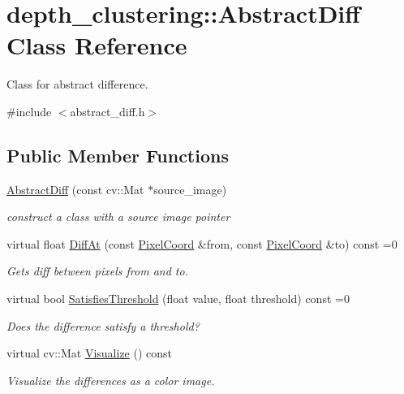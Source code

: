 \hypertarget{classdepth__clustering_1_1AbstractDiff}{\section{depth\-\_\-clustering\-:\-:Abstract\-Diff Class Reference}
\label{classdepth__clustering_1_1AbstractDiff}
}


Class for abstract difference.  




{\ttfamily \#include $<$abstract\-\_\-diff.\-h$>$}

\subsection*{Public Member Functions}
\begin{DoxyCompactItemize}
\item 
\hyperlink{classdepth__clustering_1_1AbstractDiff_a14160500db5c2c1c1948a9e563318cc8}{Abstract\-Diff} (const cv\-::\-Mat $\ast$source\-\_\-image)
\begin{DoxyCompactList}\small\item\em construct a class with a source image pointer \end{DoxyCompactList}\item 
virtual float \hyperlink{classdepth__clustering_1_1AbstractDiff_a06ba188d8d83d0e4bad66c833656c26d}{Diff\-At} (const \hyperlink{structdepth__clustering_1_1PixelCoord}{Pixel\-Coord} \&from, const \hyperlink{structdepth__clustering_1_1PixelCoord}{Pixel\-Coord} \&to) const =0
\begin{DoxyCompactList}\small\item\em Gets diff between pixels from and to. \end{DoxyCompactList}\item 
virtual bool \hyperlink{classdepth__clustering_1_1AbstractDiff_a940280569ed86d8f7e95626b1a2312d7}{Satisfies\-Threshold} (float value, float threshold) const =0
\begin{DoxyCompactList}\small\item\em Does the difference satisfy a threshold? \end{DoxyCompactList}\item 
virtual cv\-::\-Mat \hyperlink{classdepth__clustering_1_1AbstractDiff_a5500c82f3e6800922ba6fc6c22c6d0bf}{Visualize} () const 
\begin{DoxyCompactList}\small\item\em Visualize the differences as a color image. \end{DoxyCompactList}\end{DoxyCompactItemize}

